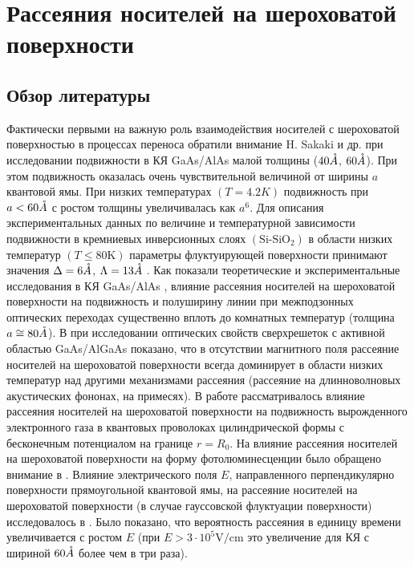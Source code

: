 \chapter{Рассеяния носителей на шероховатой поверхности} \label{chapt1}

\section{Обзор литературы} \label{sect1_1}
Фактически первыми на важную роль взаимодействия носителей с шероховатой поверхностью в процессах переноса обратили внимание H. Sakaki и др. \cite{Sakaki1987} при исследовании подвижности в КЯ GaAs/AlAs малой толщины ($40\AA$, $60\AA$). При этом подвижность оказалась очень чувствительной величиной от ширины $a$ квантовой ямы. При низких температурах $(T = 4.2 K)$ подвижность при  $a < 60 \AA$ с ростом толщины увеличивалась как $a^{6}$. Для описания экспериментальных данных по величине и температурной зависимости подвижности в кремниевых инверсионных слоях $(\text{Si-SiO}_2)$ в области низких температур $(T\le 80 \text{K})$ параметры флуктуирующей поверхности принимают значения $\Delta = 6\AA$, $\Lambda = 13\AA$ \cite{Stern1980, Cham1980}. Как показали теоретические и экспериментальные исследования в КЯ GaAs/AlAs \cite{Unuma2001}, влияние рассеяния носителей на шероховатой поверхности на подвижность и полуширину линии при межподзонных оптических переходах существенно вплоть до комнатных температур (толщина $a \cong 80 \AA$). В \cite{Leuliet2006} при исследовании оптических свойств сверхрешеток с активной областью GaAs/AlGaAs показано, что в отсутствии магнитного поля рассеяние носителей на шероховатой поверхности всегда доминирует в области низких температур над другими механизмами рассеяния (рассеяние на длинноволновых акустических фононах, на примесях). В работе \cite{Gold1990} рассматривалось влияние рассеяния носителей на шероховатой поверхности на подвижность вырожденного электронного газа в квантовых проволоках цилиндрической формы с бесконечным потенциалом на границе $r=R_0 $. На влияние рассеяния носителей на шероховатой поверхности на форму фотолюминесценции было обращено внимание в \cite{Gurioli1991}. Влияние электрического поля $E$, направленного перпендикулярно поверхности прямоугольной квантовой ямы, на рассеяние носителей на шероховатой поверхности (в случае гауссовской флуктуации поверхности) исследовалось в \cite{Ibragimov2002}. Было показано, что вероятность рассеяния в единицу времени увеличивается с ростом $E$ (при $E>3\cdot 10^5 \text{V/cm}$ это увеличение для КЯ с шириной $60 \AA$ более чем в три раза).


